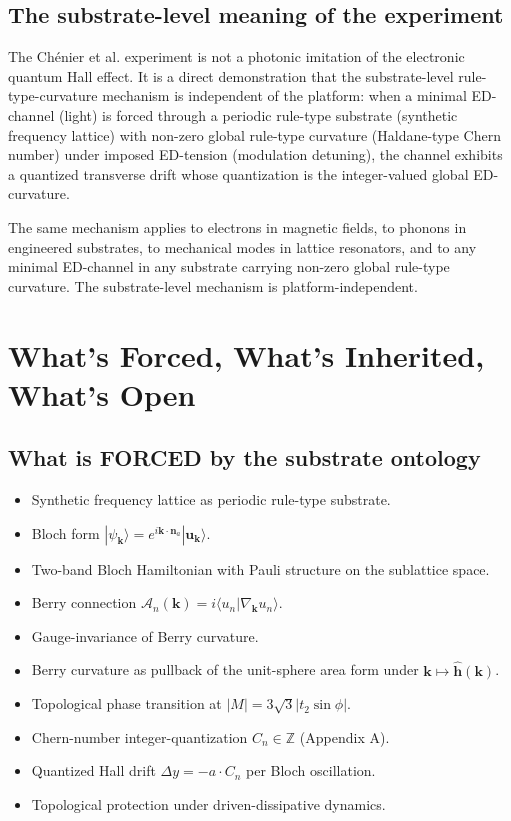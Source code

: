 \documentclass[11pt,a4paper]{article}
\begin{document}
\subsection{The substrate-level meaning of the experiment}

The Ch\'enier et al. experiment is not a photonic imitation of the electronic quantum Hall effect. It is a direct demonstration that the substrate-level rule-type-curvature mechanism is independent of the platform: when a minimal ED-channel (light) is forced through a periodic rule-type substrate (synthetic frequency lattice) with non-zero global rule-type curvature (Haldane-type Chern number) under imposed ED-tension (modulation detuning), the channel exhibits a quantized transverse drift whose quantization is the integer-valued global ED-curvature.

The same mechanism applies to electrons in magnetic fields, to phonons in engineered substrates, to mechanical modes in lattice resonators, and to any minimal ED-channel in any substrate carrying non-zero global rule-type curvature. The substrate-level mechanism is platform-independent.

\section{What's Forced, What's Inherited, What's Open}

\subsection*{What is FORCED by the substrate ontology}

\begin{itemize}[noitemsep]
  \item Synthetic frequency lattice as periodic rule-type substrate.
  \item Bloch form $|\psi_\mathbf{k}\rangle = e^{i\mathbf{k}\cdot\mathbf{n}_a}|\mathbf{u}_\mathbf{k}\rangle$.
  \item Two-band Bloch Hamiltonian with Pauli structure on the sublattice space.
  \item Berry connection $\mathcal{A}_n(\mathbf{k}) = i\langle u_n|\nabla_\mathbf{k} u_n\rangle$.
  \item Gauge-invariance of Berry curvature.
  \item Berry curvature as pullback of the unit-sphere area form under $\mathbf{k}\mapsto\hat{\mathbf{h}}(\mathbf{k})$.
  \item Topological phase transition at $|M| = 3\sqrt{3}|t_2\sin\phi|$.
  \item Chern-number integer-quantization $C_n \in \mathbb{Z}$ (Appendix A).
  \item Quantized Hall drift $\Delta y = -a\cdot C_n$ per Bloch oscillation.
  \item Topological protection under driven-dissipative dynamics.
\end{itemize}
\end{document}
